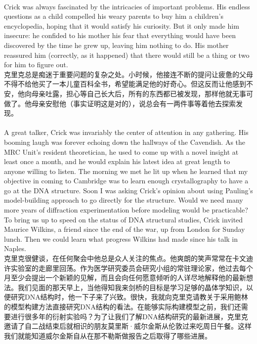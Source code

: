 \documentclass{article}
\begin{document}
\\
Crick was always fascinated by the intricacies of important problems. His endless questions as a child compelled his weary parents to buy him a children’s encyclopedia, hoping that it would satisfy his curiosity. But it only made him insecure: he confided to his mother his fear that everything would have been discovered by the time he grew up, leaving him nothing to do. His mother reassured him (correctly, as it happened) that there would still be a thing or two for him to figure out.\\
克里克总是痴迷于重要问题的复杂之处。小时候，他接连不断的提问让疲惫的父母不得不给他买了一本儿童百科全书，希望能满足他的好奇心。但这反而让他感到不安，他向母亲吐露，担心等自己长大后，所有的东西都已被发现，那样他就无事可做了。他母亲安慰他（事实证明这是对的），说总会有一两件事等着他去探索发现。\\

\\
A great talker, Crick was invariably the center of attention in any gathering. His booming laugh was forever echoing down the hallways of the Cavendish. As the MRC Unit’s resident theoretician, he used to come up with a novel insight at least once a month, and he would explain his latest idea at great length to anyone willing to listen. The morning we met he lit up when he learned that my objective in coming to Cambridge was to learn enough crystallography to have a go at the DNA structure. Soon I was asking Crick’s opinion about using Pauling’s model-building approach to go directly for the structure. Would we need many more years of diffraction experimentation before modeling would be practicable? To bring us up to speed on the status of DNA structural studies, Crick invited Maurice Wilkins, a friend since the end of the war, up from London for Sunday lunch. Then we could learn what progress Wilkins had made since his talk in Naples.\\
克里克很健谈，在任何聚会中他总是众人关注的焦点。他爽朗的笑声常常在卡文迪许实验室的走廊里回荡。作为医学研究委员会研究小组的常驻理论家，他过去每个月至少会提出一个新颖的见解，而且会向任何愿意倾听的人详尽地解释他的最新想法。我们见面的那天早上，当他得知我来剑桥的目标是学习足够的晶体学知识，以便研究DNA结构时，他一下子来了兴致。很快，我就向克里克请教关于采用鲍林的模型构建方法直接研究DNA结构的看法。在能够实际构建模型之前，我们还需要进行很多年的衍射实验吗？为了让我们了解DNA结构研究的最新进展，克里克邀请了自二战结束后就相识的朋友莫里斯·威尔金斯从伦敦过来吃周日午餐。这样我们就能知道威尔金斯自从在那不勒斯做报告之后取得了哪些进展。\\
\end{document}
